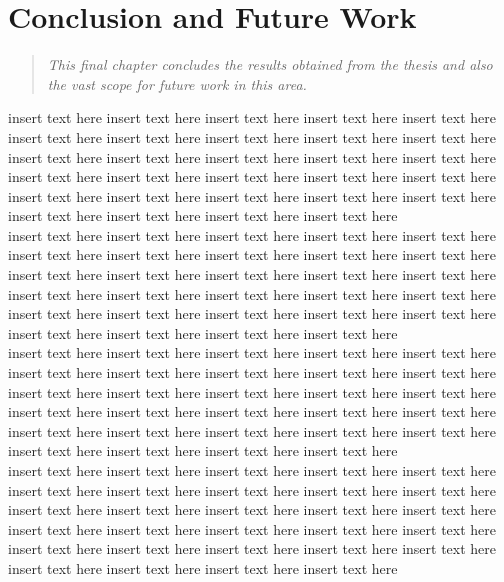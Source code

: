 \chapter{Conclusion and Future Work}
\begin{quote} 
\it This final chapter concludes the results obtained from the thesis and also the vast scope for future work in this area.
\end{quote}

insert text here insert text here insert text here insert text here insert text here
insert text here insert text here insert text here insert text here insert text here insert text here insert text here insert text here insert text here insert text here insert text here insert text here insert text here insert text here insert text here insert text here insert text here insert text here insert text here insert text here insert text here insert text here insert text here insert text here   \\

insert text here insert text here insert text here insert text here insert text here
insert text here insert text here insert text here insert text here insert text here insert text here insert text here insert text here insert text here insert text here insert text here insert text here insert text here insert text here insert text here insert text here insert text here insert text here insert text here insert text here insert text here insert text here insert text here insert text here  \\

insert text here insert text here insert text here insert text here insert text here
insert text here insert text here insert text here insert text here insert text here insert text here insert text here insert text here insert text here insert text here insert text here insert text here insert text here insert text here insert text here insert text here insert text here insert text here insert text here insert text here insert text here insert text here insert text here insert text here  \\

insert text here insert text here insert text here insert text here insert text here
insert text here insert text here insert text here insert text here insert text here insert text here insert text here insert text here insert text here insert text here insert text here insert text here insert text here insert text here insert text here insert text here insert text here insert text here insert text here insert text here insert text here insert text here insert text here insert text here  \\



